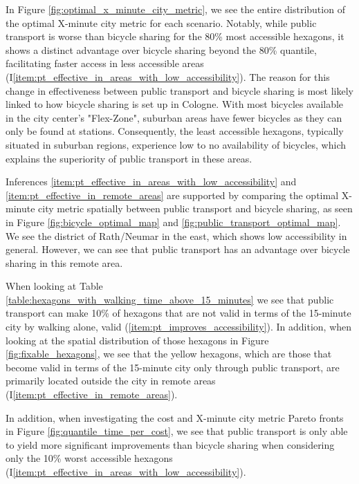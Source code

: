In Figure \ref{fig:optimal_x_minute_city_metric}, we see the entire distribution of the optimal X-minute city metric for each scenario.
Notably, while public transport is worse than bicycle sharing for the 80\% most accessible hexagons, it shows a distinct advantage over bicycle sharing beyond the 80\% quantile, facilitating faster access in less accessible areas (I\ref{item:pt_effective_in_areas_with_low_accessibility}).
The reason for this change in effectiveness between public transport and bicycle sharing is most likely linked to how bicycle sharing is set up in Cologne. 
With most bicycles available in the city center's "Flex-Zone", suburban areas have fewer bicycles as they can only be found at stations.
Consequently, the least accessible hexagons, typically situated in suburban regions, experience low to no availability of bicycles, which explains the superiority of public transport in these areas. 

Inferences \ref{item:pt_effective_in_areas_with_low_accessibility} and \ref{item:pt_effective_in_remote_areas} are supported by comparing the optimal X-minute city metric spatially between public transport and bicycle sharing, as seen in Figure \ref{fig:bicycle_optimal_map} and \ref{fig:public_transport_optimal_map}.
We see the district of Rath/Neumar in the east, which shows low accessibility in general.
However, we can see that public transport has an advantage over bicycle sharing in this remote area.

When looking at Table \ref{table:hexagons_with_walking_time_above_15_minutes} we see that public transport can make 10\% of hexagons that are not valid in terms of the 15-minute city by walking alone, valid (\ref{item:pt_improves_accessibility}).
In addition, when looking at the spatial distribution of those hexagons in Figure \ref{fig:fixable_hexagons}, we see that the yellow hexagons, which are those that become valid in terms of the 15-minute city only through public transport, are primarily located outside the city in remote areas (I\ref{item:pt_effective_in_remote_areas}).

In addition, when investigating the cost and X-minute city metric Pareto fronts in Figure \ref{fig:quantile_time_per_cost}, we see that public transport is only able to yield more significant improvements than bicycle sharing when considering only the 10\% worst accessible hexagons (I\ref{item:pt_effective_in_areas_with_low_accessibility}).

